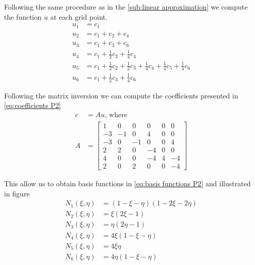 \documentclass[conference]{IEEEtran}
\begin{document}
Following the same procedure as in the \ref{sub:linear approximation} we compute the function $u$ at each grid point.
\begin{equation}
\begin{aligned}
    u_1 &= c_1 \\
    u_2 &= c_1 + c_2 + c_4 \\
    u_3 &= c_1 + c_3 + c_6 \\
    u_4 &= c_1 + \frac{1}{2}c_2 + \frac{1}{4}c_4 \\
    u_5 &= c_1 + \frac{1}{2}c_2 + \frac{1}{2}c_3 + \frac{1}{4}c_4 + \frac{1}{4}c_5 + \frac{1}{4}c_6 \\
    u_6 &= c_1 + \frac{1}{2}c_3 + \frac{1}{4}c_6
\end{aligned}
\end{equation}

Following the matrix inversion we can compute the coefficients presented in \ref{eq:coefficients P2}
\begin{equation}
\begin{aligned}
    c &= Au \text{, where}\\
    A &= \begin{bmatrix}
        1 & 0 & 0 & 0 & 0 & 0 \\
        -3 & -1 & 0 & 4 & 0 & 0 \\
        -3 & 0 & -1 & 0 & 0 & 4 \\
        2 & 2 & 0 & -4 & 0 & 0 \\
        4 & 0 & 0 & -4 & 4 & -4 \\
        2 & 0 & 2 & 0 & 0 & -4
    \end{bmatrix}
    \label{eq:coefficients P2}
\end{aligned}
\end{equation}

This allow us to obtain basis functions in \ref{eq:basis functions P2} and illustrated in figure
\begin{equation}
\begin{aligned}
    N_1(\xi, \eta) &= (1 - \xi - \eta)(1 - 2\xi - 2\eta) \\
    N_2(\xi, \eta) &= \xi(2\xi - 1) \\
    N_3(\xi, \eta) &= \eta(2\eta - 1) \\
    N_4(\xi, \eta) &= 4\xi(1 - \xi - \eta) \\
    N_5(\xi, \eta) &= 4\xi\eta \\
    N_6(\xi, \eta) &= 4\eta(1 - \xi - \eta)
    \label{eq:basis functions P2}
\end{aligned}
\end{equation}
\end{document}
